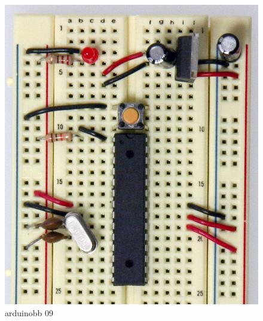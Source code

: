 \begin{figure}[!htb]
 \centering
 \includegraphics[scale=0.3]{img/arduino_breadboard/arduinobb_09.jpg}
 \caption{arduinobb 09}
 \label{arduinobb 09}
\end{figure}


